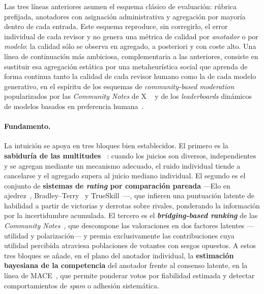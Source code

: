 Las tres líneas anteriores asumen el esquema clásico de evaluación: rúbrica
prefijada, anotadores con asignación administrativa y agregación por
mayoría dentro de cada entrada. Este esquema reproduce, sin corregirlo, el
error individual de cada revisor y no genera una métrica de calidad por
\emph{anotador} o por \emph{modelo}: la calidad sólo se observa en
agregado, a posteriori y con coste alto. Una línea de continuación más
ambiciosa, complementaria a las anteriores, consiste en sustituir esa
agregación estática por una metaheurística social que aprenda de forma
continua tanto la calidad de cada revisor humano como la de cada modelo
generativo, en el espíritu de los esquemas de \emph{community-based
	moderation} popularizados por las \textit{Community Notes} de X
~\cite{Wojcik2022} y de los \textit{leaderboards} dinámicos de modelos
basados en preferencia humana~\cite{Chiang2024_ChatbotArena}.

\paragraph{Fundamento.} La intuición se apoya en tres bloques bien
establecidos. El primero es la \textbf{sabiduría de las multitudes}
~\cite{Surowiecki2004_Wisdom}: cuando los juicios son diversos,
independientes y se agregan mediante un mecanismo adecuado, el ruido
individual tiende a cancelarse y el agregado supera al juicio mediano
individual. El segundo es el conjunto de \textbf{sistemas de
	\textit{rating} por comparación pareada} ---Elo en
ajedrez~\cite{Elo1978_Rating}, Bradley--Terry~\cite{BradleyTerry1952} y
TrueSkill~\cite{Herbrich2007_TrueSkill}---, que infieren una puntuación
latente de habilidad a partir de victorias y derrotas sobre rivales,
ponderando la información por la incertidumbre acumulada. El tercero es
el \textbf{\textit{bridging-based ranking}} de las
\textit{Community Notes}~\cite{Wojcik2022}, que descompone las
valoraciones en dos factores latentes ---utilidad y polarización--- y premia
exclusivamente las contribuciones cuya utilidad percibida atraviesa
poblaciones de votantes con sesgos opuestos. A estos tres bloques se
añade, en el plano del anotador individual, la \textbf{estimación
	bayesiana de la competencia} del anotador frente al consenso latente, en
la línea de MACE~\cite{Hovy2013_MACE}, que permite ponderar votos por
fiabilidad estimada y detectar comportamientos de \textit{spam} o
adhesión sistemática.

